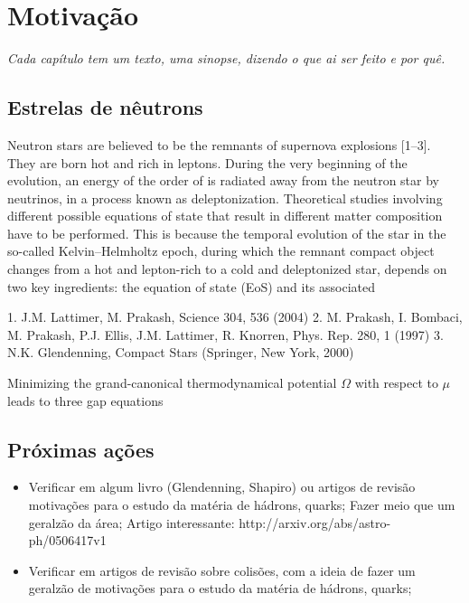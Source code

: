 \chapter{Motivação}

\begin{fullwidth}\it
Cada capítulo tem um texto, uma sinopse, dizendo o que ai ser feito e por quê.
\end{fullwidth}

\section{Estrelas de nêutrons}

Neutron stars are believed to be the remnants of supernova
explosions [1–3]. They are born hot and rich in leptons. During
the very beginning of the evolution, an energy of the order
of  is radiated away from the neutron star by
neutrinos, in a process known as deleptonization. Theoretical
studies involving different possible equations of state
that result in different matter composition have to be performed.
This is because the temporal evolution of the star
in the so-called Kelvin–Helmholtz epoch, during which the
remnant compact object changes from a hot and lepton-rich
to a cold and deleptonized star, depends on two key ingredients:
the equation of state (EoS) and its associated

1. J.M. Lattimer, M. Prakash, Science 304, 536 (2004)
2. M. Prakash, I. Bombaci, M. Prakash, P.J. Ellis, J.M. Lattimer,
R. Knorren, Phys. Rep. 280, 1 (1997)
3. N.K. Glendenning, Compact Stars (Springer, New York, 2000)

Minimizing the grand-canonical thermodynamical potential
$\Omega$ with respect to $\mu$ leads to three gap equations

\section{Próximas ações}

\begin{itemize}
	\item Verificar em algum livro (Glendenning, Shapiro) ou artigos de revisão motivações para o estudo da matéria de hádrons, quarks; Fazer meio que um geralzão da área; Artigo interessante: http://arxiv.org/abs/astro-ph/0506417v1
	\item Verificar em artigos de revisão sobre colisões, com a ideia de fazer um geralzão de motivações para o estudo da matéria de hádrons, quarks;
\end{itemize}
